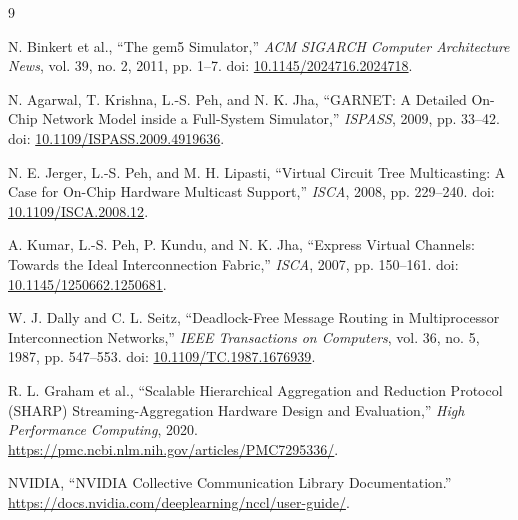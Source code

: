 \documentclass[10pt]{article}
\begin{document}
\begin{thebibliography}{9}

N. Binkert et al., ``The gem5 Simulator,'' \emph{ACM SIGARCH Computer
Architecture News}, vol. 39, no. 2, 2011, pp. 1--7.
doi: \href{https://doi.org/10.1145/2024716.2024718}{10.1145/2024716.2024718}.

N. Agarwal, T. Krishna, L.-S. Peh, and N. K. Jha, ``GARNET: A Detailed
On-Chip Network Model inside a Full-System Simulator,'' \emph{ISPASS}, 2009,
pp. 33--42.
doi: \href{https://doi.org/10.1109/ISPASS.2009.4919636}{10.1109/ISPASS.2009.4919636}.

N. E. Jerger, L.-S. Peh, and M. H. Lipasti, ``Virtual Circuit Tree
Multicasting: A Case for On-Chip Hardware Multicast Support,'' \emph{ISCA},
2008, pp. 229--240.
doi: \href{https://doi.org/10.1109/ISCA.2008.12}{10.1109/ISCA.2008.12}.

A. Kumar, L.-S. Peh, P. Kundu, and N. K. Jha, ``Express Virtual Channels:
Towards the Ideal Interconnection Fabric,'' \emph{ISCA}, 2007, pp. 150--161.
doi: \href{https://doi.org/10.1145/1250662.1250681}{10.1145/1250662.1250681}.

W. J. Dally and C. L. Seitz, ``Deadlock-Free Message Routing in
Multiprocessor Interconnection Networks,'' \emph{IEEE Transactions on
Computers}, vol. 36, no. 5, 1987, pp. 547--553.
doi: \href{https://doi.org/10.1109/TC.1987.1676939}{10.1109/TC.1987.1676939}.

R. L. Graham et al., ``Scalable Hierarchical Aggregation and Reduction
Protocol (SHARP) Streaming-Aggregation Hardware Design and Evaluation,''
\emph{High Performance Computing}, 2020.
\url{https://pmc.ncbi.nlm.nih.gov/articles/PMC7295336/}.

NVIDIA, ``NVIDIA Collective Communication Library Documentation.''
\url{https://docs.nvidia.com/deeplearning/nccl/user-guide/}.

\end{thebibliography}
\end{document}
